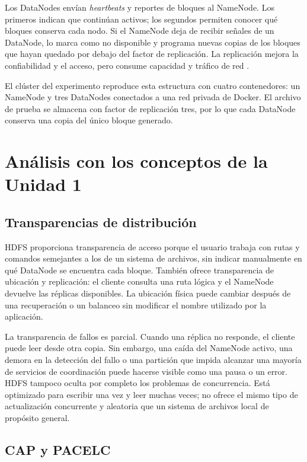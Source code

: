\documentclass[12pt,a4paper]{article}
\begin{document}
Los DataNodes envían \textit{heartbeats} y reportes de bloques al NameNode. Los primeros indican que continúan activos; los segundos permiten conocer qué bloques conserva cada nodo. Si el NameNode deja de recibir señales de un DataNode, lo marca como no disponible y programa nuevas copias de los bloques que hayan quedado por debajo del factor de replicación. La replicación mejora la confiabilidad y el acceso, pero consume capacidad y tráfico de red \cite{swaroopa2023replication}.

El clúster del experimento reproduce esta estructura con cuatro contenedores: un NameNode y tres DataNodes conectados a una red privada de Docker. El archivo de prueba se almacena con factor de replicación tres, por lo que cada DataNode conserva una copia del único bloque generado.



\section{Análisis con los conceptos de la Unidad 1}

\subsection{Transparencias de distribución}

HDFS proporciona transparencia de acceso porque el usuario trabaja con rutas y comandos semejantes a los de un sistema de archivos, sin indicar manualmente en qué DataNode se encuentra cada bloque. También ofrece transparencia de ubicación y replicación: el cliente consulta una ruta lógica y el NameNode devuelve las réplicas disponibles. La ubicación física puede cambiar después de una recuperación o un balanceo sin modificar el nombre utilizado por la aplicación.

La transparencia de fallos es parcial. Cuando una réplica no responde, el cliente puede leer desde otra copia. Sin embargo, una caída del NameNode activo, una demora en la detección del fallo o una partición que impida alcanzar una mayoría de servicios de coordinación puede hacerse visible como una pausa o un error. HDFS tampoco oculta por completo los problemas de concurrencia. Está optimizado para escribir una vez y leer muchas veces; no ofrece el mismo tipo de actualización concurrente y aleatoria que un sistema de archivos local de propósito general.

\subsection{CAP y PACELC}
\end{document}
